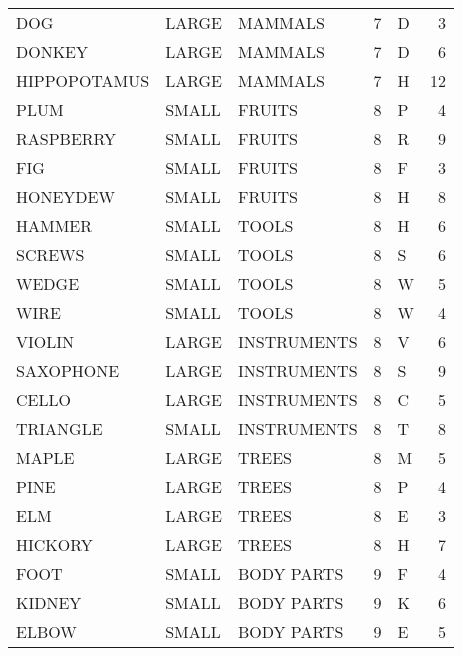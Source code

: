 \begin{tabular}{lllrlr}
         DOG & LARGE &          MAMMALS &        7 &            D &       3 \\
      DONKEY & LARGE &          MAMMALS &        7 &            D &       6 \\
HIPPOPOTAMUS & LARGE &          MAMMALS &        7 &            H &      12 \\
        PLUM & SMALL &           FRUITS &        8 &            P &       4 \\
   RASPBERRY & SMALL &           FRUITS &        8 &            R &       9 \\
         FIG & SMALL &           FRUITS &        8 &            F &       3 \\
    HONEYDEW & SMALL &           FRUITS &        8 &            H &       8 \\
      HAMMER & SMALL &            TOOLS &        8 &            H &       6 \\
      SCREWS & SMALL &            TOOLS &        8 &            S &       6 \\
       WEDGE & SMALL &            TOOLS &        8 &            W &       5 \\
        WIRE & SMALL &            TOOLS &        8 &            W &       4 \\
      VIOLIN & LARGE &      INSTRUMENTS &        8 &            V &       6 \\
   SAXOPHONE & LARGE &      INSTRUMENTS &        8 &            S &       9 \\
       CELLO & LARGE &      INSTRUMENTS &        8 &            C &       5 \\
    TRIANGLE & SMALL &      INSTRUMENTS &        8 &            T &       8 \\
       MAPLE & LARGE &            TREES &        8 &            M &       5 \\
        PINE & LARGE &            TREES &        8 &            P &       4 \\
         ELM & LARGE &            TREES &        8 &            E &       3 \\
     HICKORY & LARGE &            TREES &        8 &            H &       7 \\
        FOOT & SMALL &       BODY PARTS &        9 &            F &       4 \\
      KIDNEY & SMALL &       BODY PARTS &        9 &            K &       6 \\
       ELBOW & SMALL &       BODY PARTS &        9 &            E &       5 \\

\end{tabular}
